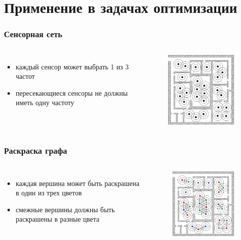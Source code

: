 \documentclass{beamer}
\begin{document}
\section{Применение в задачах оптимизации}

\begin{frame}
  \frametitle{Сенсорная сеть}
  \begin{columns}[c]
    \begin{itemize}
      \item каждый сенсор может выбрать 1 из 3 частот
      \item пересекающиеся сенсоры не должны иметь одну частоту
    \end{itemize}

    \begin{figure}
       \includegraphics[width=5cm]{images/sensors.jpg}
    \end{figure}
  \end{columns}
\end{frame}

\begin{frame}
  \frametitle{Раскраска графа}
  \begin{columns}[c]
    \begin{itemize}
      \item каждая вершина может быть раскрашена в один из трех цветов
      \item смежные вершины должны быть раскрашены в разные цвета
    \end{itemize}

    \begin{figure}
       \includegraphics[width=5cm]{images/graph-coloring.jpg}
    \end{figure}
  \end{columns}
\end{frame}
\end{document}

